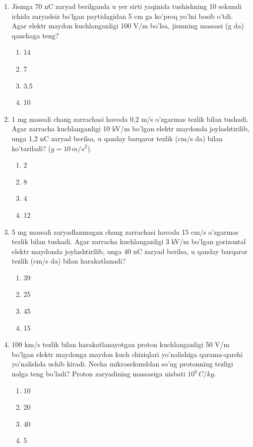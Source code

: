 \begin{enumerate}
    \item Jismga 70 nC zaryad berilganda u yer sirti yaqinida tushishning 10 sekundi ichida zaryadsiz bo’lgan paytidagidan 5 cm ga ko’proq yo’lni bosib o’tdi. Agar elektr maydon kuchlanganligi 100 V/m bo’lsa, jismning massasi (g da) qanchaga teng? 
    \begin{enumerate}[label=\Alph*)]
        \item 14
        \item 7 %
        \item 3,5
        \item 10
    \end{enumerate}

    \item 1 mg massali chang zarrachasi havoda 0,2 m/s o’zgarmas tezlik bilan tushadi. Agar zarracha kuchlanganligi 10 kV/m bo’lgan elektr maydonda joylashtirilib, unga 1,2 nC zaryad berilsa, u qanday barqaror tezlik (cm/s da) bilan ko’tariladi? ($g=10 \, m/s^2$). 
    \begin{enumerate}[label=\Alph*)]
        \item 2
        \item 8
        \item 4 %
        \item 12
    \end{enumerate}

    \item 5 mg massali zaryadlanmagan chang zarrachasi havoda 15 cm/s o’zgarmas tezlik bilan tushadi. Agar zarracha kuchlanganligi 3 kV/m bo’lgan gorizontal elektr maydonda joylashtirilib, unga 40 nC zaryad berilsa, u qanday barqaror tezlik (cm/s da) bilan harakatlanadi? 
    \begin{enumerate}[label=\Alph*)]
        \item 39 %
        \item 25
        \item 45
        \item 15
    \end{enumerate}

    \item 100 km/s tezlik bilan harakatlanayotgan proton kuchlanganligi 50 V/m bo’lgan elektr maydonga maydon kuch chiziqlari yo’nalishiga qarama-qarshi yo’nalishda uchib kiradi. Necha mikrosekunddan so’ng protonning tezligi nolga teng bo’ladi? Proton zaryadining massasiga nisbati $10^8 \, C/kg$. 
    \begin{enumerate}[label=\Alph*)]
        \item 10
        \item 20 %
        \item 40
        \item 5
    \end{enumerate}


\end{enumerate}
